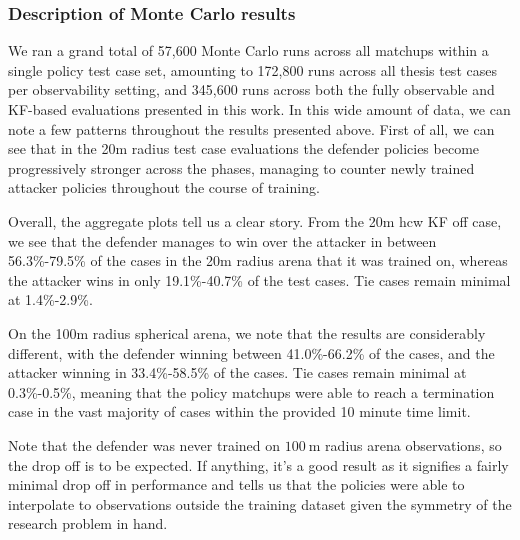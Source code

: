 \clearpage




\subsubsection{Description of Monte Carlo results}
\label{sec:mc_results_description}



We ran a grand total of 57,600 Monte Carlo runs across all matchups within a single policy test case set, amounting to 172,800 runs across all thesis test cases per observability setting, and 345,600 runs across both the fully observable and KF-based evaluations presented in this work. In this wide amount of data, we can note a few patterns throughout the results presented above. First of all, we can see that in the 20m radius test case evaluations the defender policies become progressively stronger across the phases, managing to counter newly trained attacker policies throughout the course of training.

Overall, the aggregate plots tell us a clear story. From the 20m \acs{hcw} KF off case, we see that the defender manages to win over the attacker in between 56.3\%-79.5\% of the cases in the 20m radius arena that it was trained on, whereas the attacker wins in only 19.1\%-40.7\% of the test cases. Tie cases remain minimal at 1.4\%-2.9\%.

On the 100m radius spherical arena, we note that the results are considerably different, with the defender winning between 41.0\%-66.2\% of the cases, and the attacker winning in 33.4\%-58.5\% of the cases. Tie cases remain minimal at 0.3\%-0.5\%, meaning that the policy matchups were able to reach a termination case in the vast majority of cases within the provided 10 minute time limit.


Note that the defender was never trained on $100~\mathrm{m}$ radius  arena observations, so the drop off is to be expected. If anything, it's a good result as it signifies a fairly minimal drop off in performance and tells us that the policies were able to interpolate to observations outside the training dataset given the symmetry of the research problem in hand.

